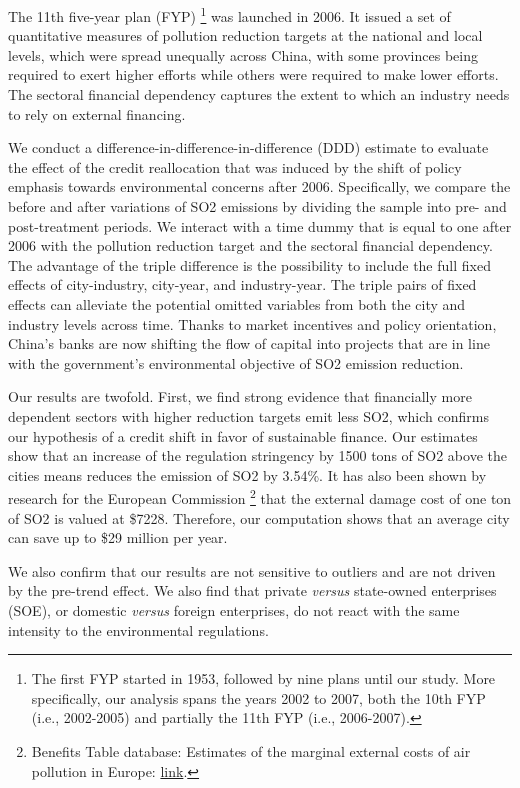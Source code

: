 \documentclass[12pt]{article}
\begin{document}
The 11th five-year plan (FYP) \footnote{The first FYP started in 1953, followed by nine plans until our study. More specifically, our analysis spans the  years 2002 to 2007, both the 10th FYP (i.e., 2002-2005) and partially the 11th FYP (i.e., 2006-2007).} was launched in 2006. It issued a set of quantitative measures of pollution reduction targets at the national and local levels, which were spread unequally across China, with some provinces being required to exert higher efforts while others were required to make lower efforts. The sectoral financial dependency captures the extent to which an industry needs to rely on external financing.

We conduct a difference-in-difference-in-difference (DDD) estimate to evaluate the effect of the credit reallocation that was induced by the shift of policy emphasis towards environmental concerns after 2006. Specifically, we compare the before and after variations of SO2 emissions by dividing the sample into pre- and post-treatment periods. We interact with a time dummy that is equal to one after 2006 with the pollution reduction target and the sectoral financial dependency. The advantage of the triple difference is the possibility to include the full fixed effects of city-industry, city-year, and industry-year. The triple pairs of fixed effects can alleviate the potential omitted variables from both the city and industry levels across time. Thanks to market incentives and policy orientation, China’s banks are now shifting the flow of capital into projects that are in line with the government's environmental objective of SO2 emission reduction.

Our results are twofold. First, we find strong evidence that financially more dependent sectors with higher reduction targets emit less SO2, which confirms our hypothesis of a credit shift in favor of sustainable finance. Our estimates show that an increase of the regulation stringency by 1500 tons of SO2 above the cities means reduces the emission of SO2 by 3.54\%. It has also been shown by research for the European Commission \footnote{Benefits Table database:
Estimates of the marginal external costs of air pollution in Europe: \href{https://ec.europa.eu/environment/enveco/air/pdf/betaec02a.pdf}{link}.} that the external damage cost of one ton of SO2 is valued at \$7228. Therefore, our computation shows that an average city can save up to \$29 million per year.

We also confirm that our results are not sensitive to outliers and are not driven by the pre-trend effect. We also find that private \textit{versus} state-owned enterprises (SOE), or domestic \textit{versus} foreign enterprises, do not react with the same intensity to the environmental regulations.
\end{document}
